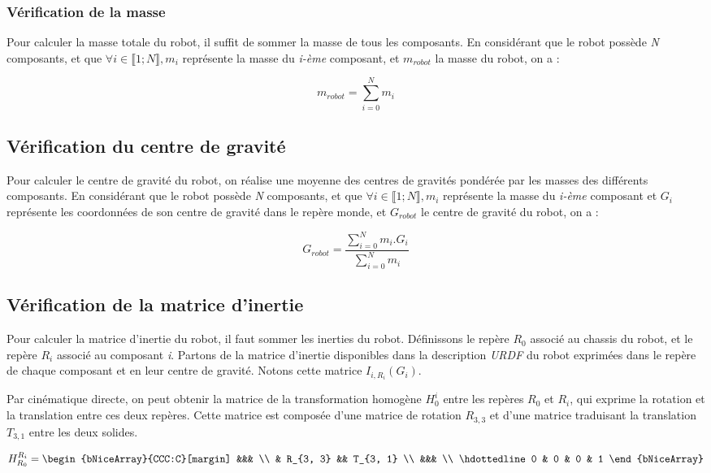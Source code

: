 			\subsubsection{Vérification de la masse}

				Pour calculer la masse totale du robot, il suffit de sommer la masse de tous les composants. En considérant que le robot possède \textit{N} composants, et que $\forall i \in \llbracket 1; N \rrbracket, m_i$ représente la masse du \textit{i-ème} composant, et $m_{robot}$ la masse du robot, on a :

				$$m_{robot} = \sum_{i=0}^{N}m_i$$

			\subsection{Vérification du centre de gravité}

				Pour calculer le centre de gravité du robot, on réalise une moyenne des centres de gravités pondérée par les masses des différents composants. En considérant que le robot possède \textit{N} composants, et que $\forall i \in \llbracket 1; N \rrbracket, m_i$ représente la masse du \textit{i-ème} composant et $G_i$ représente les coordonnées de son centre de gravité dans le repère monde, et $G_{robot}$ le centre de gravité du robot, on a :

				$$G_{robot} = \frac{\sum_{i=0}^{N}m_i.G_i}{\sum_{i=0}^{N}m_i}$$

			\subsection{Vérification de la matrice d'inertie}

				Pour calculer la matrice d'inertie du robot, il faut sommer les inerties du robot. Définissons le repère $R_0$ associé au chassis du robot, et le repère $R_i$ associé au composant \textit{i}. Partons de la matrice d'inertie disponibles dans la description \textit{URDF} du robot exprimées dans le repère de chaque composant et en leur centre de gravité. Notons cette matrice $I_{i, R_i}(G_i)$. 
				
				Par cinématique directe, on peut obtenir la matrice de la transformation homogène $H_0^i$ entre les repères $R_0$ et $R_i$, qui exprime la rotation et la translation entre ces deux repères. Cette matrice est composée d'une matrice de rotation $R_{3, 3}$ et d'une matrice traduisant la translation $T_{3, 1}$ entre les deux solides.

				$$H_{R_0}^{R_i} = \begin{bNiceArray}{CCC:C}[margin] &&& \\ & R_{3, 3} && T_{3, 1} \\ &&& \\ \hdottedline 0 & 0 & 0 & 1 \end{bNiceArray}$$

